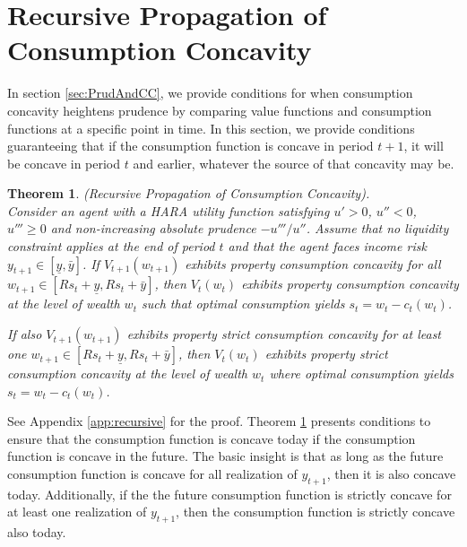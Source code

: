 \documentclass[titlepage]{\econtex}
\newtheorem{theorem}{Theorem}
\begin{document}
\section{Recursive Propagation of Consumption Concavity}\label{sec:Aggregation} 

  
In section \ref{sec:PrudAndCC}, we provide conditions for when consumption concavity heightens prudence by comparing value functions and consumption functions at a specific point in time. In this section, we provide conditions guaranteeing that if the consumption function is concave in period $t+1$, it will be concave in period $t$ and earlier, whatever the source of that concavity may be.

\begin{theorem}\label{thm:recursive}(Recursive Propagation of Consumption Concavity). \\
	Consider an agent with a HARA utility function satisfying $u' > 0$, $u'' < 0$, $u''' \geq 0$ and non-increasing absolute prudence $-u'''/u''$. Assume that no liquidity constraint applies at the end of period $t$ and that the agent faces income risk $y_{t+1} \in [\underline{y},\bar{y}]$. If $V_{t+1}(w_{t+1})$ exhibits property consumption concavity for all $w_{t+1} \in [Rs_t + \underline{y}, Rs_t + \bar{y}]$, then $V_t(w_t)$ exhibits property consumption concavity at the level of wealth $w_t$ such that optimal consumption yields $s_t = w_t - c_t(w_t)$.

	\medskip
	If also $V_{t+1}(w_{t+1})$ exhibits property strict consumption concavity for at least one $w_{t+1} \in [Rs_t + \underline{y}, Rs_t + \bar{y}]$, then $V_t(w_t)$ exhibits property strict consumption concavity at the level of wealth $w_t$ where optimal consumption yields $s_t = w_t - c_t(w_t)$.
\end{theorem}
See Appendix \ref{app:recursive} for the proof. Theorem \ref{thm:recursive} presents conditions to ensure that the consumption function is concave today if the consumption function is concave in the future. The basic insight is that as long as the future consumption function is concave for all realization of $y_{t+1}$, then it is also concave today. Additionally, if the
the future consumption function is strictly concave for at least one realization of ${y}_{t+1}$, then the consumption function is strictly concave also today. %
\end{document}
